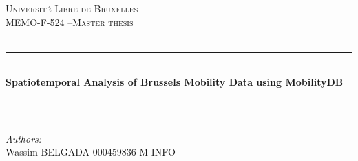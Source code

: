 \documentclass[12pt]{report}
\begin{document}
	\begin{titlepage}
		\newcommand{\HRule}{\rule{\linewidth}{0.5mm}} %
		
		\center %
		
		
		\textsc{\LARGE Université Libre de Bruxelles}\\[1.5cm] %
		\textsc{\Large MEMO-F-524 –Master thesis}\\[0.5cm] %
		\textsc{\large }\\[0.5cm] %
		
		
		\HRule \\[0.4cm]
		{ \huge \bfseries Spatiotemporal Analysis of Brussels Mobility Data using MobilityDB}\\[0.4cm] %
		\HRule \\[1.5cm]
		
		
		\begin{minipage}{0.4\textwidth}
			\begin{flushleft} \large
				\emph{Authors:}\\
				Wassim \textsc{BELGADA} 000459836 M-INFO\\
			\end{flushleft}
		\end{minipage}
		~
		\begin{minipage}{0.4\textwidth}
			\begin{flushright} \large
			\end{flushright}
		\end{minipage}\\[2cm]
		
		

\end{titlepage}
\end{document}
